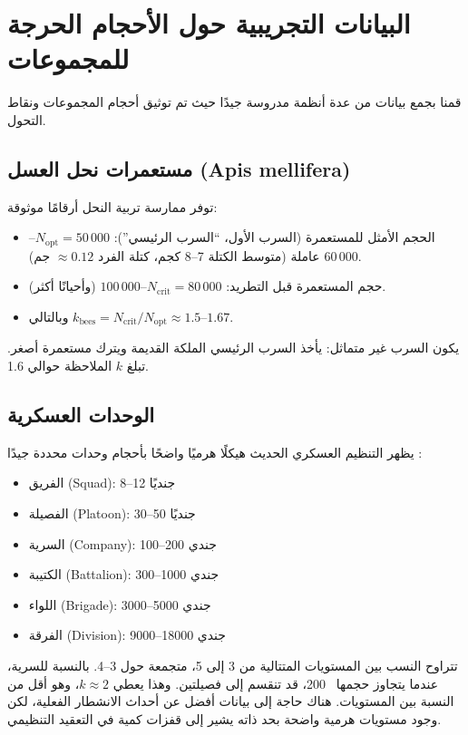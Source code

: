 \documentclass[12pt]{article}
\theoremstyle{remark}
\begin{document}
	\section{البيانات التجريبية حول الأحجام الحرجة للمجموعات}
	\label{sec:data}
	
	قمنا بجمع بيانات من عدة أنظمة مدروسة جيدًا حيث تم توثيق أحجام المجموعات ونقاط التحول.
	
	\subsection{مستعمرات نحل العسل (Apis mellifera)}
	\label{subsec:bees}
	
	توفر ممارسة تربية النحل أرقامًا موثوقة:
	\begin{itemize}
		\item الحجم الأمثل للمستعمرة (السرب الأول، ``السرب الرئيسي''): \(N_{\text{opt}} = 50\,000\)–\(60\,000\) عاملة (متوسط الكتلة 7–8 كجم، كتلة الفرد \(\approx 0.12\) جم). \cite{Seeley2010, Winston1987}
		\item حجم المستعمرة قبل التطريد: \(N_{\text{crit}} = 80\,000\)–\(100\,000\) (وأحيانًا أكثر). \cite{bees}
		\item وبالتالي \(k_{\text{bees}} = N_{\text{crit}}/N_{\text{opt}} \approx 1.5\)–\(1.67\).
	\end{itemize}
	يكون السرب غير متماثل: يأخذ السرب الرئيسي الملكة القديمة ويترك مستعمرة أصغر. تبلغ \(k\) الملاحظة حوالي 1.6.
	
	\subsection{الوحدات العسكرية}
	\label{subsec:military}
	
	يظهر التنظيم العسكري الحديث هيكلًا هرميًا واضحًا بأحجام وحدات محددة جيدًا \cite{FM3-90.5}:
	\begin{itemize}
		\item الفريق (Squad): 8–12 جنديًا
		\item الفصيلة (Platoon): 30–50 جنديًا
		\item السرية (Company): 100–200 جندي
		\item الكتيبة (Battalion): 300–1000 جندي
		\item اللواء (Brigade): 3000–5000 جندي
		\item الفرقة (Division): 9000–18000 جندي
	\end{itemize}
	تتراوح النسب بين المستويات المتتالية من 3 إلى 5، متجمعة حول 3–4. بالنسبة للسرية، عندما يتجاوز حجمها ~200، قد تنقسم إلى فصيلتين. وهذا يعطي \(k \approx 2\)، وهو أقل من النسبة بين المستويات. هناك حاجة إلى بيانات أفضل عن أحداث الانشطار الفعلية، لكن وجود مستويات هرمية واضحة بحد ذاته يشير إلى قفزات كمية في التعقيد التنظيمي.
	
\end{document}
